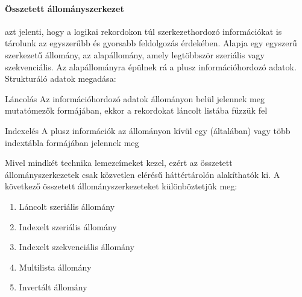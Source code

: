 \paragraph{Összetett állományszerkezet} azt jelenti, hogy a logikai rekordokon túl szerkezethordozó információkat is tárolunk az egyszerűbb és gyorsabb feldolgozás érdekében. Alapja egy egyszerű szerkezetű állomány, az alapállomány, amely legtöbbször szeriális vagy szekvenciális. Az alapállományra épülnek rá a plusz információhordozó adatok.  Strukturáló adatok megadása:
\begin{enumdescript}[nosep]
	\item[Láncolás] Az információhordozó adatok állományon belül jelennek meg mutatómezők formájában, ekkor a rekordokat láncolt listába fűzzük fel
	\item[Indexelés] A plusz információk az állományon kívül egy (általában) vagy több indextábla formájában jelennek meg
\end{enumdescript}
Mivel mindkét technika lemezcímeket kezel, ezért az összetett állományszerkezetek csak közvetlen elérésű háttértárolón alakíthatók ki. A következő összetett állományszerkezeteket különböztetjük meg:
\begin{enumerate}[nosep]
	\item Láncolt szeriális állomány
	\item Indexelt szeriális állomány
	\item Indexelt szekvenciális állomány
	\item Multilista állomány
	\item Invertált állomány
\end{enumerate}